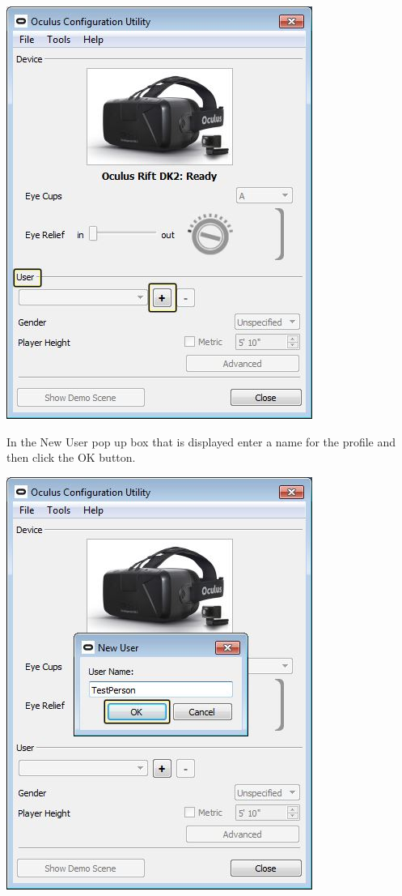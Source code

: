 \begin{center}
\centering
\includegraphics[scale=0.75]{Oculus_Config_Add_Profile}\\
\end{center}
In the New User pop up box that is displayed enter a name for the profile and then click the OK button.
\begin{center}
\centering
\includegraphics[scale=0.75]{Oculus_Config_Name_Profile}\\
\end{center}
